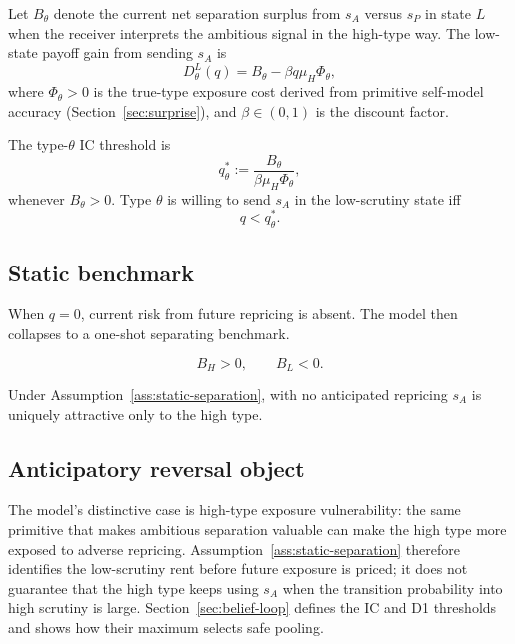 Let $B_\theta$ denote the current net separation surplus from $s_A$ versus $s_P$ in state $L$ when the receiver interprets the ambitious signal in the high-type way. The low-state payoff gain from sending $s_A$ is
\[
D_\theta^L(q)=B_\theta-\beta q\mu_H\Phi_\theta,
\]
where $\Phi_\theta>0$ is the true-type exposure cost derived from primitive self-model accuracy (Section~\ref{sec:surprise}), and $\beta\in(0,1)$ is the discount factor.

The type-$\theta$ IC threshold is
\[
q_\theta^*:=\frac{B_\theta}{\beta\mu_H\Phi_\theta},
\]
whenever $B_\theta>0$. Type $\theta$ is willing to send $s_A$ in the low-scrutiny state iff
\[
q<q_\theta^*.
\]

\subsection{Static benchmark}

When $q=0$, current risk from future repricing is absent. The model then collapses to a one-shot separating benchmark.

\begin{assumption}
\label{ass:static-separation}
\[
B_H>0,\qquad B_L<0.
\]
\end{assumption}

Under Assumption~\ref{ass:static-separation}, with no anticipated repricing $s_A$ is uniquely attractive only to the high type.

\subsection{Anticipatory reversal object}

The model's distinctive case is high-type exposure vulnerability: the same primitive that makes ambitious separation valuable can make the high type more exposed to adverse repricing. Assumption~\ref{ass:static-separation} therefore identifies the low-scrutiny rent before future exposure is priced; it does not guarantee that the high type keeps using \(s_A\) when the transition probability into high scrutiny is large. Section~\ref{sec:belief-loop} defines the IC and D1 thresholds and shows how their maximum selects safe pooling.
